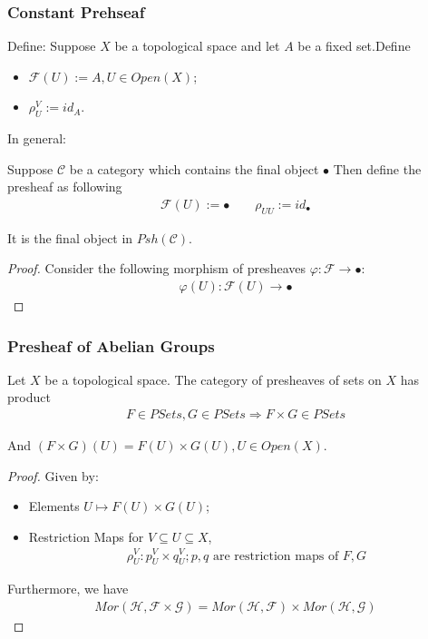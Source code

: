 \documentclass[Total.tex]{subfiles}
\begin{document}
				\subsubsection{Constant Prehseaf}
					\begin{Def}
						Define: Suppose $X$ be a topological space and let $A$ be a fixed set.Define
						\begin{itemize}
							\item $\mathcal{F}(U):=A,U\in Open(X)$;
							\item $\rho_U^V:=id_A$.
						\end{itemize}
					\end{Def}
					
					In general:
					
				\begin{Def}
					Suppose $\mathcal{C}$ be a category which contains the final object $\bullet$ Then define the presheaf as following
					\begin{gather*}
						\mathcal{F}(U):=\bullet \qquad \rho_{UU}:=id_\bullet
					\end{gather*}
				\end{Def}
				It is the final object in $Psh(\mathcal{C})$. 
				\begin{proof}
					Consider the following morphism of presheaves $\varphi:\mathcal{F}\rightarrow \bullet$:
					\begin{gather*}
						\varphi(U):\mathcal{F}(U)\rightarrow \bullet
					\end{gather*}
				\end{proof}
				\subsubsection{Presheaf of Abelian Groups}
				
				\begin{proposition}
					Let $X$ be a topological space. The category of presheaves of sets on $X$ has product
					\begin{gather*}
						F\in PSets,G\in PSets\Rightarrow F\times G\in PSets
					\end{gather*}
					
					And $(F\times G)(U)=F(U)\times G(U),U\in Open(X)$.
				\end{proposition}
				\begin{proof}
					Given by:
					\begin{itemize}
						\item Elements $U\mapsto F(U)\times G(U)$;
						\item Restriction Maps for $V\subseteq U\subseteq X$,
						\begin{gather*}
							\rho_U^V:p_U^V\times q_U^V;p,q\mbox{ are restriction maps of }F,G
						\end{gather*}
					\end{itemize}
					Furthermore, we have
					\begin{gather}
						Mor(\mathcal{H},\mathcal{F}\times \mathcal{G})=Mor(\mathcal{H},\mathcal{F})\times Mor(\mathcal{H},\mathcal{G})
					\end{gather}
				\end{proof}
				
\end{document}
